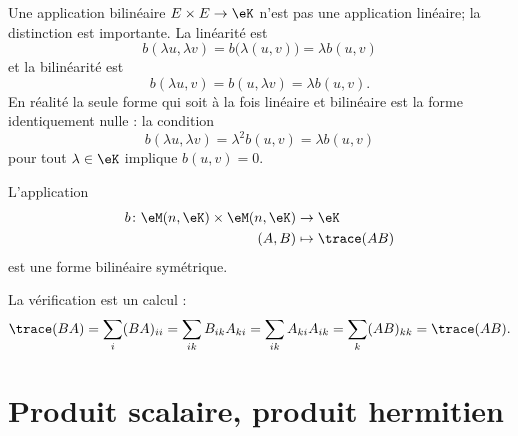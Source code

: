 \begin{normaltext}
    Une application bilinéaire \( E\times E\to \eK\) n'est pas une application linéaire; la distinction est importante. La linéarité est
    \begin{equation}
        b(\lambda u,\lambda v)= b\big( \lambda(u,v) \big)=\lambda b(u,v)
    \end{equation}
    et la bilinéarité est
    \begin{equation}
        b(\lambda u,v)=b(u,\lambda v)=\lambda b(u,v).
    \end{equation}
    En réalité la seule forme qui soit à la fois linéaire et bilinéaire est la forme identiquement nulle : la condition
    \begin{equation}
        b(\lambda u,\lambda v)=\lambda^2b(u,v)=\lambda b(u,v)
    \end{equation}
    pour tout \( \lambda\in \eK\) implique \( b(u,v)=0\).
\end{normaltext}

\begin{example}
    L'application
    \begin{equation}
        \begin{aligned}
            b\colon \eM(n,\eK)\times \eM(n,\eK)&\to \eK \\
            (A,B)&\mapsto \trace(AB) 
        \end{aligned}
    \end{equation}
    est une forme bilinéaire symétrique.

    La vérification est un calcul :
    \begin{equation}
        \trace(BA)=\sum_{i}(BA)_{ii}=\sum_{ik}B_{ik}A_{ki}=\sum_{ik}A_{ki}A_{ik}=\sum_k(AB)_{kk}=\trace(AB).
    \end{equation}
\end{example}

\section{Produit scalaire, produit hermitien}

